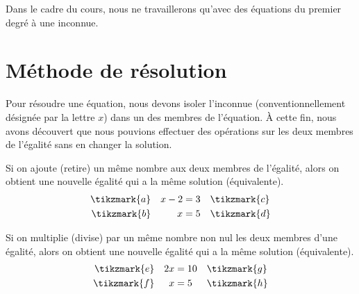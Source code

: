 \documentclass[../math2.tex]{subfiles}
\begin{document}

 Dans le cadre du cours, nous ne travaillerons qu'avec des équations du premier degré à une inconnue.

\newpage
\section{Méthode de résolution}

Pour résoudre une équation, nous devons isoler l'inconnue (conventionnellement désignée par la lettre $x$) dans un des membres de l'équation. À cette fin, nous avons découvert que nous pouvions effectuer des opérations sur les deux membres de l'égalité sans en changer la solution.
\tikzexternaldisable
\begin{tcolorbox}[title=Les principes d'équivalences]
  Si on ajoute (retire) un même nombre aux deux membres de l'égalité, alors on obtient une nouvelle égalité qui a la même solution (équivalente).
  \begin{equation*}
    \begin{aligned}
     \tikzmark{a} && x-2 & = 3 &&\tikzmark{c}\\
     \tikzmark{b} && x   & = 5 &&\tikzmark{d} 
   \end{aligned}
\end{equation*}


  Si on multiplie (divise) par un même nombre non nul les deux membres d'une égalité, alors on obtient une nouvelle égalité qui a la même solution (équivalente).
  \begin{equation*}
    \begin{aligned}
     \tikzmark{e} && 2x & = 10 &&\tikzmark{g}\\
     \tikzmark{f} && x   & = 5 &&\tikzmark{h} 
   \end{aligned}
\end{equation*}

\end{tcolorbox}
\tikzexternaldisable
\end{document}

